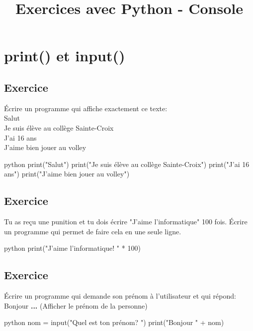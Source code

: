 \documentclass[a4paper,11pt]{article}
\begin{document}
\title{Exercices avec Python - Console}
\date{}
\maketitle

\section{print() et input()}

\subsection{Exercice}
Écrire un programme qui affiche exactement ce texte:\\
Salut\\
Je suis élève au collège Sainte-Croix\\
J'ai 16 ans\\
J'aime bien jouer au volley\\
\begin{solution}
\begin{code}[interactive]{python}
print("Salut")
print("Je suis élève au collège Sainte-Croix")
print("J'ai 16 ans")
print("J'aime bien jouer au volley")
\end{code}
\end{solution}

\subsection{Exercice}
Tu as reçu une punition et tu dois écrire "J'aime l'informatique" 100 fois.
Écrire un programme qui permet de faire cela en une seule ligne.
\begin{solution}
\begin{code}[interactive]{python}
print("J'aime l'informatique! \n" * 100)
\end{code}
\end{solution}

\subsection{Exercice}
Écrire un programme qui demande son prénom à l'utilisateur et qui répond:\\
Bonjour \textbf{...} (Afficher le prénom de la personne)\\
\begin{solution}
\begin{code}[interactive]{python}
nom = input("Quel est ton prénom? ")
print("Bonjour " + nom)
\end{code}
\end{solution}
\end{document}

